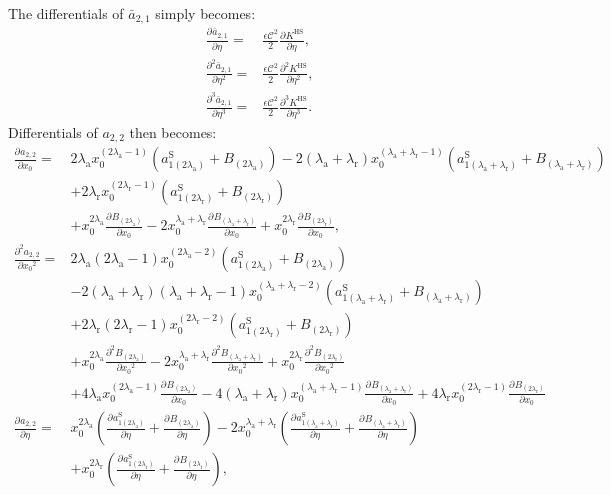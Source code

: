 \documentclass[english]{../thermomemo/thermomemo}
\newcommand*{\pd}[3][]{\frac{\partial^{#1}#2}{\partial{#3}^{#1}}}%
\newcommand*{\lb}{\left(}
\newcommand*{\rb}{\right)}
\newcommand{\hs}{\text{HS}\xspace}
\newcommand{\lama}{\ensuremath{{\lambda_{\text{a}}}}\xspace}
\newcommand{\lamr}{\ensuremath{{\lambda_{\text{r}}}}\xspace}
\newcommand{\ab}{\ensuremath{\bar{a}}\xspace}
\newcommand*{\aSl}[1]{\ensuremath{a_{1{#1}}^{\text{S}}}\xspace}
\begin{document}
The differentials of $\ab_{2,1} $ simply becomes:
\begin{align}
  \label{eq:ab_21_diff}
  \pd{\ab_{2,1}}{\eta} =& \frac{\epsilon \mathcal{C}^2}{2} \pd{K^\hs}{\eta},\\
  \pd[2]{\ab_{2,1}}{\eta} =& \frac{\epsilon \mathcal{C}^2}{2} \pd[2]{K^\hs}{\eta},\\
  \pd[3]{\ab_{2,1}}{\eta} =& \frac{\epsilon \mathcal{C}^2}{2} \pd[3]{K^\hs}{\eta}.
\end{align}
Differentials of $a_{2,2}$ then becomes:
\begin{align}
  \label{eq:a_22_diff}
  \pd{a_{2,2}}{x_0} =& 2\lama x_0^{\lb 2\lama - 1\rb}\lb \aSl{\lb 2\lama\rb} + B_{\lb 2\lama\rb}\rb
       -2\lb\lama + \lamr\rb x_0^{\lb\lama + \lamr - 1\rb}\lb \aSl{\lb\lama + \lamr\rb}  + B_{\lb\lama + \lamr\rb}\rb \nonumber \\&
   + 2\lamr  x_0^{\lb 2\lamr -1 \rb}\lb \aSl{\lb 2\lamr\rb} + B_{\lb 2\lamr\rb}\rb
  \nonumber \\ & +
         x_0^{2\lama} \pd{B_{\lb 2\lama\rb}}{x_0}  -2x_0^{\lama + \lamr}\pd{B_{\lb\lama + \lamr\rb}}{x_0}
   + x_0^{2\lamr}\pd{B_{\lb 2\lamr\rb}}{x_0},\\
  \pd[2]{a_{2,2}}{x_0} =& 2\lama \lb 2\lama - 1\rb x_0^{\lb 2\lama - 2\rb}\lb \aSl{\lb 2\lama\rb} + B_{\lb 2\lama\rb}\rb \nonumber \\
       &-2\lb\lama + \lamr\rb \lb\lama + \lamr - 1\rb x_0^{\lb\lama + \lamr - 2\rb}\lb \aSl{\lb\lama + \lamr\rb}  + B_{\lb\lama + \lamr\rb}\rb \nonumber \\&
   + 2\lamr \lb 2\lamr -1 \rb x_0^{\lb 2\lamr -2 \rb}\lb \aSl{\lb 2\lamr\rb} + B_{\lb 2\lamr\rb}\rb
  \nonumber \\ & +
         x_0^{2\lama} \pd[2]{B_{\lb 2\lama\rb}}{x_0}  -2x_0^{\lama + \lamr}\pd[2]{B_{\lb\lama + \lamr\rb}}{x_0}
                 + x_0^{2\lamr}\pd[2]{B_{\lb 2\lamr\rb}}{x_0} \nonumber \\
  &+ 4\lama x_0^{\lb 2\lama - 1\rb} \pd{B_{\lb 2\lama\rb}}{x_0}
       -4\lb\lama + \lamr\rb x_0^{\lb\lama + \lamr - 1\rb} \pd{B_{\lb\lama + \lamr\rb}}{x_0} + 4\lamr  x_0^{\lb 2\lamr -1 \rb}\pd{B_{\lb 2\lamr\rb}}{x_0} \\
  \pd{a_{2,2}}{\eta} =& x_0^{2\lama}\lb \pd{\aSl{\lb 2\lama\rb}}{\eta} + \pd{B_{\lb 2\lama\rb}}{\eta}\rb
       -2x_0^{\lama + \lamr}\lb \pd{\aSl{\lb\lama + \lamr\rb}}{\eta}  + \pd{B_{\lb\lama + \lamr\rb}}{\eta}\rb \nonumber \\
  & + x_0^{2\lamr}\lb \pd{\aSl{\lb 2\lamr\rb}}{\eta} + \pd{B_{\lb 2\lamr\rb}}{\eta}\rb,\\

\end{align}
\end{document}

